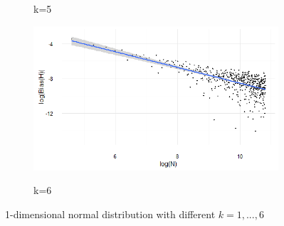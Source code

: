 \documentclass{report}
\begin{document}
\begin{figure}
{\begin{subfigure}[b]{.8\textwidth}
\caption{k=5}
\end{subfigure}%
\begin{subfigure}[b]{.8\textwidth}
\centering
\includegraphics[width=\textwidth]{./Graphs/Best/Normal_k=6.png}\label{normal_k=6}
\caption{k=6}
\end{subfigure}%
}
\caption{1-dimensional normal distribution with different $k = 1, ..., 6$} \label{normal_graphs16}
\end{figure}
\end{document}
